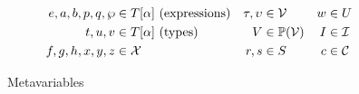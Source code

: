\begin{figure}
\centering
\begin{align*}
e, a, b, p, q, \wp  &\in T[\alpha]    ~ \text{(expressions)}  & \tau, \upsilon  &\in \mathcal{V}      & w &\in U \\
t, u, v             &\in T[\alpha]    ~ \text{(types)}        & V               &\in \mathbb{P}(\mathcal{V})  & I     &\in \mathcal{I}\\
f, g, h, x, y, z    &\in \mathcal{X}                          & r, s            &\in S                & c     &\in \mathcal{C}
\end{align*}
\caption{Metavariables}
\label{fig:metavariables}
\end{figure}
